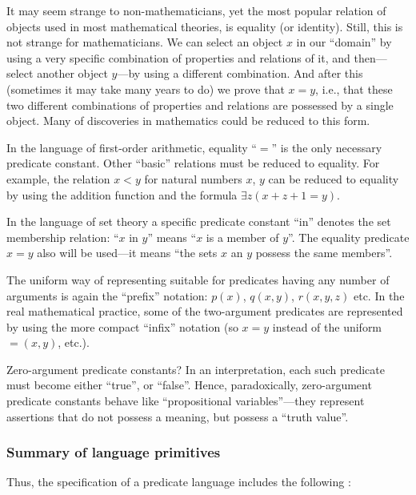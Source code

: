 \begin{example}
It may seem strange to non-mathematicians, yet the most popular relation of objects used in most mathematical theories, is equality (or identity).
Still, this is not strange for mathematicians.
We can select an object \(x\) in our ``domain'' by using a very specific combination of properties and relations of it, and then---select another object \(y\)---by using a different combination.
And after this (sometimes it may take many years to do) we prove that \(x=y\), i.e., that these two different combinations of properties and relations are possessed by a single object.
Many of discoveries in mathematics could be reduced to this form.

In the language of first-order arithmetic, equality ``\(=\)'' is the only necessary predicate constant.
Other ``basic'' relations must be reduced to equality.
For example, the relation \(x<y\) for natural numbers \(x\), \(y\) can be reduced to equality by using the addition function and the formula \(\exists z(x+z+1=y)\).
\end{example}

\begin{example}
In the language of set theory a specific predicate constant ``in'' denotes the set membership relation: ``\(x\) in \(y\)'' means ``\(x\) is a member of \(y\)''.
The equality predicate \(x=y\) also will be used---it means ``the sets \(x\) an \(y\) possess the same members''.
\end{example}

The uniform way of representing suitable for predicates having any number of arguments is again the ``prefix'' notation: \(p(x)\), \(q(x, y)\), \(r(x, y, z)\) etc.
In the real mathematical practice, some of the two-argument predicates are represented by using the more compact ``infix'' notation (so \(x=y\) instead of the uniform \(=(x, y)\), etc.).

Zero-argument predicate constants?
In an interpretation, each such predicate must become either ``true'', or ``false''.
Hence, paradoxically, zero-argument predicate constants behave like ``propositional variables''---they represent assertions that do not possess a meaning, but possess a ``truth value''.

\subsubsection*{Summary of language primitives}

Thus, the specification of a predicate language includes the following :

